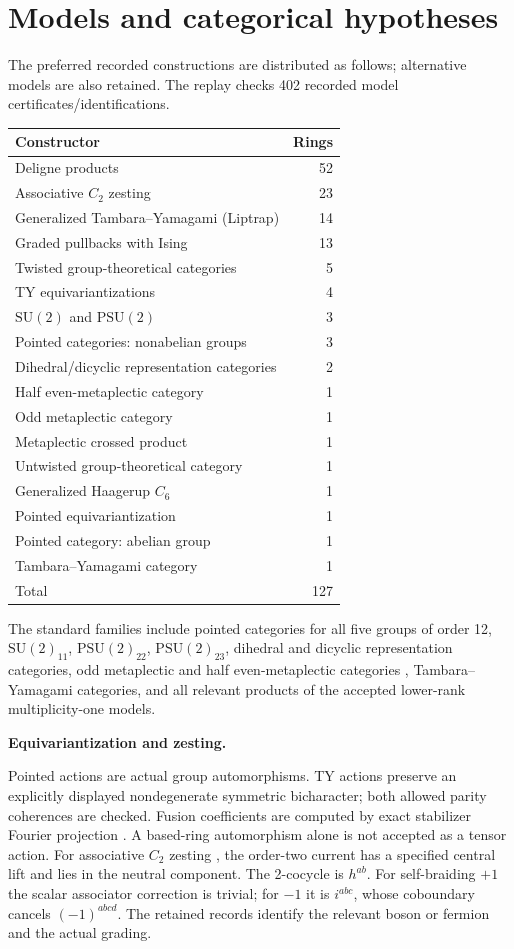 \documentclass[11pt]{article}
\begin{document}
\section{Models and categorical hypotheses}
The preferred recorded constructions are distributed as follows; alternative models
are also retained. The replay checks 402 recorded model certificates/identifications.
\begin{center}\small\begin{tabular}{lr}\toprule Constructor & Rings\\\midrule
Deligne products & 52 \\
Associative $C_2$ zesting & 23 \\
Generalized Tambara--Yamagami (Liptrap) & 14 \\
Graded pullbacks with Ising & 13 \\
Twisted group-theoretical categories & 5 \\
TY equivariantizations & 4 \\
$\mathrm{SU}(2)$ and $\mathrm{PSU}(2)$ & 3 \\
Pointed categories: nonabelian groups & 3 \\
Dihedral/dicyclic representation categories & 2 \\
Half even-metaplectic category & 1 \\
Odd metaplectic category & 1 \\
Metaplectic crossed product & 1 \\
Untwisted group-theoretical category & 1 \\
Generalized Haagerup $C_6$ & 1 \\
Pointed equivariantization & 1 \\
Pointed category: abelian group & 1 \\
Tambara--Yamagami category & 1 \\
\midrule Total &127\\\bottomrule\end{tabular}\end{center}
The standard families include pointed categories for all five groups of order 12,
$\mathrm{SU}(2)_{11}$, $\mathrm{PSU}(2)_{22}$, $\mathrm{PSU}(2)_{23}$, dihedral and
dicyclic representation categories, odd metaplectic and half even-metaplectic
categories \cite{Metaplectic}, Tambara--Yamagami categories, and all relevant
products of the accepted lower-rank multiplicity-one models.

\textbf{Equivariantization and zesting.}\par
Pointed actions are actual group automorphisms. TY actions preserve an explicitly
displayed nondegenerate symmetric bicharacter; both allowed parity coherences are
checked. Fusion coefficients are computed by exact stabilizer Fourier projection
\cite{Equiv}. A based-ring automorphism alone is not accepted as a tensor action.
For associative $C_2$ zesting \cite{Zesting}, the order-two current has a specified
central lift and lies in the neutral component. The 2-cocycle is $h^{ab}$.
For self-braiding $+1$ the scalar associator correction is trivial; for $-1$ it is
$i^{abc}$, whose coboundary cancels $(-1)^{abcd}$. The retained records identify
the relevant boson or fermion and the actual grading.
\end{document}
